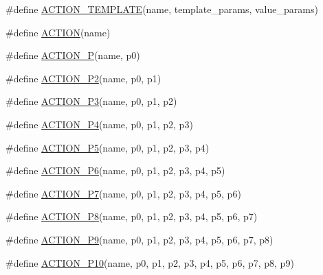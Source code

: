\begin{DoxyCompactItemize}
\item 
\#define \mbox{\hyperlink{googletest-master_2googlemock_2include_2gmock_2gmock-generated-actions_8h_ad04fa741f313f0c23924d61fcfb1536d}{A\+C\+T\+I\+O\+N\+\_\+\+T\+E\+M\+P\+L\+A\+TE}}(name,  template\+\_\+params,  value\+\_\+params)
\item 
\#define \mbox{\hyperlink{googletest-master_2googlemock_2include_2gmock_2gmock-generated-actions_8h_a7af7137aa4871df4235881af377205fe}{A\+C\+T\+I\+ON}}(name)
\item 
\#define \mbox{\hyperlink{googletest-master_2googlemock_2include_2gmock_2gmock-generated-actions_8h_a8ee9766f611f068271ca37a90c0e5960}{A\+C\+T\+I\+O\+N\+\_\+P}}(name,  p0)
\item 
\#define \mbox{\hyperlink{googletest-master_2googlemock_2include_2gmock_2gmock-generated-actions_8h_a69fbf9ae696cc4cf779e22cb0960a067}{A\+C\+T\+I\+O\+N\+\_\+\+P2}}(name,  p0,  p1)
\item 
\#define \mbox{\hyperlink{googletest-master_2googlemock_2include_2gmock_2gmock-generated-actions_8h_ab038de3f66ae709773473c18b6a43b29}{A\+C\+T\+I\+O\+N\+\_\+\+P3}}(name,  p0,  p1,  p2)
\item 
\#define \mbox{\hyperlink{googletest-master_2googlemock_2include_2gmock_2gmock-generated-actions_8h_af416cf9b0288fce8b2c4b71e4df6cfc0}{A\+C\+T\+I\+O\+N\+\_\+\+P4}}(name,  p0,  p1,  p2,  p3)
\item 
\#define \mbox{\hyperlink{googletest-master_2googlemock_2include_2gmock_2gmock-generated-actions_8h_ad0bb4c20795e7efe55b9b76f334554b2}{A\+C\+T\+I\+O\+N\+\_\+\+P5}}(name,  p0,  p1,  p2,  p3,  p4)
\item 
\#define \mbox{\hyperlink{googletest-master_2googlemock_2include_2gmock_2gmock-generated-actions_8h_a3a8af72f23167873fcd5fc7476a4fabc}{A\+C\+T\+I\+O\+N\+\_\+\+P6}}(name,  p0,  p1,  p2,  p3,  p4,  p5)
\item 
\#define \mbox{\hyperlink{googletest-master_2googlemock_2include_2gmock_2gmock-generated-actions_8h_a82d96846bae4fee8432385fd24b0a7ee}{A\+C\+T\+I\+O\+N\+\_\+\+P7}}(name,  p0,  p1,  p2,  p3,  p4,  p5,  p6)
\item 
\#define \mbox{\hyperlink{googletest-master_2googlemock_2include_2gmock_2gmock-generated-actions_8h_a150147ecae8b84107be8575e4b2560cc}{A\+C\+T\+I\+O\+N\+\_\+\+P8}}(name,  p0,  p1,  p2,  p3,  p4,  p5,  p6,  p7)
\item 
\#define \mbox{\hyperlink{googletest-master_2googlemock_2include_2gmock_2gmock-generated-actions_8h_a6a38804f2dce3fa758335676b4c26cda}{A\+C\+T\+I\+O\+N\+\_\+\+P9}}(name,  p0,  p1,  p2,  p3,  p4,  p5,  p6,  p7,  p8)
\item 
\#define \mbox{\hyperlink{googletest-master_2googlemock_2include_2gmock_2gmock-generated-actions_8h_aff3ff3b23965dd03539aa4cbc5181002}{A\+C\+T\+I\+O\+N\+\_\+\+P10}}(name,  p0,  p1,  p2,  p3,  p4,  p5,  p6,  p7,  p8,  p9)
\end{DoxyCompactItemize}
